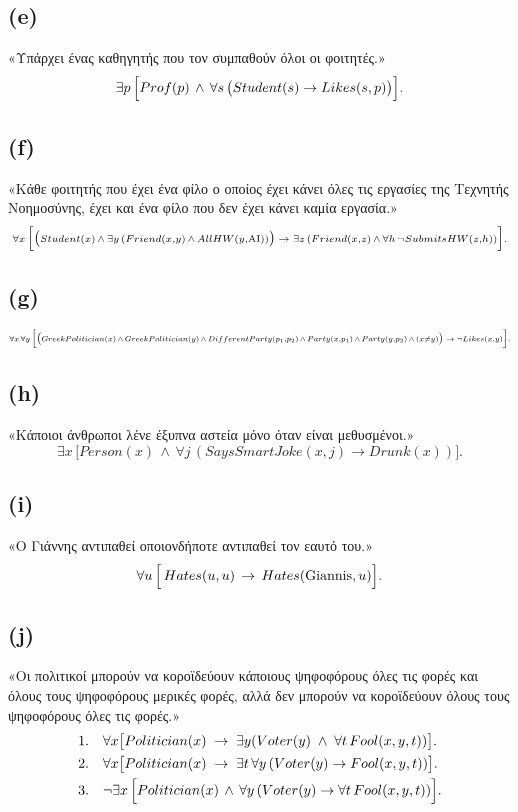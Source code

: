 \documentclass[a4paper,12pt]{article}
\begin{document}
\subsection*{(e)}
«Υπάρχει ένας καθηγητής που τον συμπαθούν όλοι οι φοιτητές.»
\[
\exists p\,\Bigl[Prof(p)\,\wedge\,\forall s\,\bigl(Student(s)\to Likes(s,p)\bigr)\Bigr].
\]

\subsection*{(f)}
«Κάθε φοιτητής που έχει ένα φίλο ο οποίος έχει κάνει όλες τις εργασίες της Τεχνητής Νοημοσύνης, έχει και ένα φίλο που δεν έχει κάνει καμία εργασία.»
\[
\scriptstyle
\forall x\,\Bigl[\bigl(Student(x)\,\wedge\,\exists y\,(Friend(x,y)\,\wedge\,AllHW(y,\text{AI}))\bigr)\;\to\;\exists z\,(Friend(x,z)\,\wedge\,\forall h\,\neg SubmitsHW(z,h))\Bigr].
\]

\subsection*{(g)}
\[
\scriptstyle
\forall x\,\forall y\,\Bigl[\bigl(GreekPolitician(x)\,\wedge\,GreekPolitician(y)\,\wedge\,DifferentParty(p_1,p_2)\,\wedge\,Party(x,p_1)\,\wedge\,Party(y,p_2)\,\wedge\,(x\neq y)\bigr)\;\to\;\neg Likes(x,y)\Bigr].
\]


\subsection*{(h)}
«Κάποιοι άνθρωποι λένε έξυπνα αστεία μόνο όταν είναι μεθυσμένοι.»
\[
\exists x\,\bigl[Person(x)\,\wedge\,\forall j\,(SaysSmartJoke(x,j)\to Drunk(x))\bigr].
\]

\subsection*{(i)}
«Ο Γιάννης αντιπαθεί οποιονδήποτε αντιπαθεί τον εαυτό του.»
\[
\forall u\,\Bigl[\,Hates(u,u)\,\to\,Hates(\text{Giannis},u)\Bigr].
\]

\subsection*{(j)}
«Οι πολιτικοί μπορούν να κοροϊδεύουν κάποιους ψηφοφόρους όλες τις φορές και όλους τους ψηφοφόρους μερικές φορές, αλλά δεν μπορούν να κοροϊδεύουν όλους τους ψηφοφόρους όλες τις φορές.»
\begin{align*}
1. & \quad \forall x \bigl[ Politician(x)\;\to\;\exists y (Voter(y)\;\wedge\;\forall t\,Fool(x,y,t)) \bigr]. \\
2. & \quad \forall x \bigl[ Politician(x)\;\to\;\exists t\,\forall y\,(Voter(y)\to Fool(x,y,t)) \bigr]. \\
3. & \quad \neg\exists x\,\Bigl[Politician(x)\,\wedge\,\forall y\,(Voter(y)\to \forall t\,Fool(x,y,t))\Bigr].
\end{align*}
\end{document}
